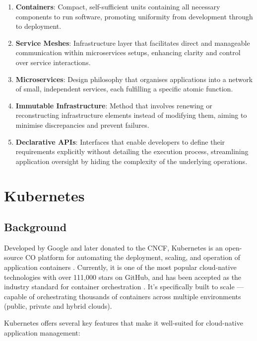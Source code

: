 \begin{enumerate}
\item
  \textbf{Containers}: Compact, self-sufficient units containing all necessary components to run software, promoting uniformity from development through to deployment.
\item
  \textbf{Service Meshes}: Infrastructure layer that facilitates direct and manageable communication within microservices setups, enhancing clarity and control over service interactions.
\item
  \textbf{Microservices}: Design philosophy that organises applications into a network of small, independent services, each fulfilling a specific atomic function.
\item
  \textbf{Immutable Infrastructure}: Method that involves renewing or reconstructing infrastructure elements instead of modifying them, aiming to minimise discrepancies and prevent failures.
\item
  \textbf{Declarative APIs}: Interfaces that enable developers to define their requirements explicitly without detailing the execution process, streamlining application oversight by hiding the complexity of the underlying operations.
\end{enumerate}

\section{Kubernetes}\label{kubernetes}
\subsection{Background}

Developed by Google and later donated to the CNCF, Kubernetes is an open-source CO platform for automating the deployment, scaling, and operation of application containers \cite{Kubernetes}. Currently, it is one of the most popular cloud-native technologies with over 111,000 stars on GitHub, and has been accepted as the industry standard for container orchestration \cite{truyenComprehensiveFeatureComparison2019, KubernetesKubernetesProductionGrade}. It's specifically built to scale — capable of orchestrating thousands of containers across multiple environments (public, private and hybrid clouds).

Kubernetes offers several key features that make it well-suited for cloud-native application management:

